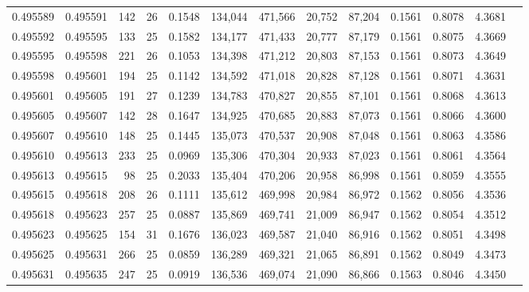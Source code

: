 \begin{tabular}{rrrrrrrrrrrrr}
0.495589 & 0.495591 & 142 &  26 &                                     0.1548 & 134,044 & 471,566 &  20,752 &  87,204 & 0.1561 & 0.8078 & 4.3681 \\
0.495592 & 0.495595 & 133 &  25 &                                     0.1582 & 134,177 & 471,433 &  20,777 &  87,179 & 0.1561 & 0.8075 & 4.3669 \\
0.495595 & 0.495598 & 221 &  26 &                                     0.1053 & 134,398 & 471,212 &  20,803 &  87,153 & 0.1561 & 0.8073 & 4.3649 \\
0.495598 & 0.495601 & 194 &  25 &                                     0.1142 & 134,592 & 471,018 &  20,828 &  87,128 & 0.1561 & 0.8071 & 4.3631 \\
0.495601 & 0.495605 & 191 &  27 &                                     0.1239 & 134,783 & 470,827 &  20,855 &  87,101 & 0.1561 & 0.8068 & 4.3613 \\
0.495605 & 0.495607 & 142 &  28 &                                     0.1647 & 134,925 & 470,685 &  20,883 &  87,073 & 0.1561 & 0.8066 & 4.3600 \\
0.495607 & 0.495610 & 148 &  25 &                                     0.1445 & 135,073 & 470,537 &  20,908 &  87,048 & 0.1561 & 0.8063 & 4.3586 \\
0.495610 & 0.495613 & 233 &  25 &                                     0.0969 & 135,306 & 470,304 &  20,933 &  87,023 & 0.1561 & 0.8061 & 4.3564 \\
0.495613 & 0.495615 &  98 &  25 &                                     0.2033 & 135,404 & 470,206 &  20,958 &  86,998 & 0.1561 & 0.8059 & 4.3555 \\
0.495615 & 0.495618 & 208 &  26 &                                     0.1111 & 135,612 & 469,998 &  20,984 &  86,972 & 0.1562 & 0.8056 & 4.3536 \\
0.495618 & 0.495623 & 257 &  25 &                                     0.0887 & 135,869 & 469,741 &  21,009 &  86,947 & 0.1562 & 0.8054 & 4.3512 \\
0.495623 & 0.495625 & 154 &  31 &                                     0.1676 & 136,023 & 469,587 &  21,040 &  86,916 & 0.1562 & 0.8051 & 4.3498 \\
0.495625 & 0.495631 & 266 &  25 &                                     0.0859 & 136,289 & 469,321 &  21,065 &  86,891 & 0.1562 & 0.8049 & 4.3473 \\
0.495631 & 0.495635 & 247 &  25 &                                     0.0919 & 136,536 & 469,074 &  21,090 &  86,866 & 0.1563 & 0.8046 & 4.3450 \\

\end{tabular}
